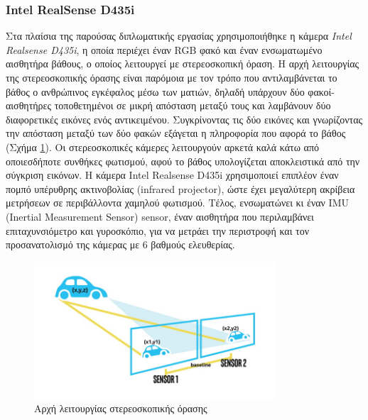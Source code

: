 \subsubsection{Intel RealSense D435i}
Στα πλαίσια της παρούσας διπλωματικής εργασίας χρησιμοποιήθηκε η κάμερα \emph{Intel Realsense D435i}, η οποία περιέχει έναν RGB φακό και έναν ενσωματωμένο αισθητήρα βάθους, ο οποίος λειτουργεί με στερεοσκοπική όραση. Η αρχή λειτουργίας της στερεοσκοπικής όρασης είναι παρόμοια με τον τρόπο που αντιλαμβάνεται το βάθος ο ανθρώπινος εγκέφαλος μέσω των ματιών, δηλαδή υπάρχουν δύο φακοί-αισθητήρες τοποθετημένοι σε μικρή απόσταση μεταξύ τους και λαμβάνουν δύο διαφορετικές εικόνες ενός αντικειμένου. Συγκρίνοντας τις δύο εικόνες και γνωρίζοντας την απόσταση μεταξύ των δύο φακών εξάγεται η πληροφορία που αφορά το βάθος (Σχήμα \ref{fig:stereo}). Οι στερεοσκοπικές κάμερες λειτουργούν αρκετά καλά κάτω από οποιεσδήποτε συνθήκες φωτισμού, αφού το βάθος υπολογίζεται αποκλειστικά από την σύγκριση εικόνων. Η κάμερα Intel Realsense D435i χρησιμοποιεί επιπλέον έναν πομπό υπέρυθρης ακτινοβολίας (infrared projector), ώστε έχει μεγαλύτερη ακρίβεια μετρήσεων σε περιβάλλοντα χαμηλού φωτισμού. Τέλος, ενσωματώνει κι έναν IMU (Inertial Measurement Sensor) sensor, έναν αισθητήρα που περιλαμβάνει επιταχυνσιόμετρο και γυροσκόπιο, για να μετράει την περιστροφή και τον προσανατολισμό της κάμερας με 6 βαθμούς ελευθερίας.

\begin{figure}[H]
        \centering
        \includegraphics[width=0.8\textwidth]{images/how_stereo_depth_works.jpg}
        \caption{Αρχή λειτουργίας στερεοσκοπικής όρασης}
        \label{fig:stereo}
    \end{figure}


